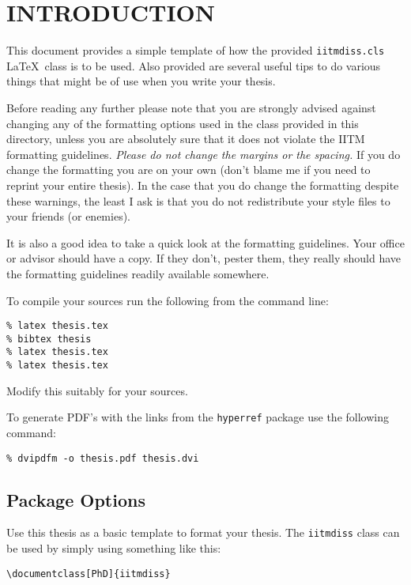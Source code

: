 \chapter{INTRODUCTION}
\label{chap:intro}

This document provides a simple template of how the provided
\verb+iitmdiss.cls+ \LaTeX\ class is to be used.  Also provided are
several useful tips to do various things that might be of use when you
write your thesis.

Before reading any further please note that you are strongly advised
against changing any of the formatting options used in the class
provided in this directory, unless you are absolutely sure that it
does not violate the IITM formatting guidelines.  \emph{Please do not
  change the margins or the spacing.}  If you do change the formatting
you are on your own (don't blame me if you need to reprint your entire
thesis).  In the case that you do change the formatting despite these
warnings, the least I ask is that you do not redistribute your style
files to your friends (or enemies).

It is also a good idea to take a quick look at the formatting
guidelines.  Your office or advisor should have a copy.  If they
don't, pester them, they really should have the formatting guidelines
readily available somewhere.

To compile your sources run the following from the command line:
\begin{verbatim}
% latex thesis.tex
% bibtex thesis
% latex thesis.tex
% latex thesis.tex
\end{verbatim}
Modify this suitably for your sources.

To generate PDF's with the links from the \verb+hyperref+ package use
the following command:
\begin{verbatim}
% dvipdfm -o thesis.pdf thesis.dvi
\end{verbatim}

\section{Package Options}

Use this thesis as a basic template to format your thesis.  The
\verb+iitmdiss+ class can be used by simply using something like this:
\begin{verbatim}
\documentclass[PhD]{iitmdiss}  
\end{verbatim}

